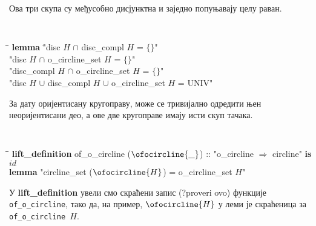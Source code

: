 Ова три скупа су међусобно дисјунктна и заједно попуњавају целу раван.
{\tt
\begin{tabbing}
\hspace{5mm}\=\hspace{5mm}\=\hspace{5mm}\=\hspace{5mm}\=\hspace{5mm}\=\kill
{\bf lemma} \="disc $H$ $\cap$ disc\_compl $H$ = $\{\}$" \\
\>"disc $H$ $\cap$ o\_circline\_set $H$ = $\{\}$"\\
\>"disc\_compl $H$ $\cap$ o\_circline\_set $H$ = $\{\}$"\\
\>"disc $H$ $\cup$ disc\_compl $H$ $\cup$ o\_circline\_set $H$ = UNIV"
\end{tabbing}
}

За дату оријентисану кругоправу, може се тривијално одредити њен
неоријентисани део, а ове две кругоправе имају исти скуп тачака.
{\tt
  \begin{tabbing}
    \hspace{5mm}\=\hspace{5mm}\=\hspace{5mm}\=\hspace{5mm}\=\hspace{5mm}\=\kill
{\bf lift\_definition} of\_o\_circline ($\ofocircline{\_}$) :: "o\_circline $\Rightarrow$ circline" {\bf is} $id$ \\
{\bf lemma} "circline\_set ($\ofocircline{H}$) = o\_circline\_set $H$"
  \end{tabbing}
}

У {\bf lift\_definition} увели смо скраћени запис (?proveri ovo)
функције {\tt of\_o\_circline}, тако да, на пример, $\ofocircline{H}$
у леми је скраћеница за {\tt of\_o\_circline\ $H$}.

